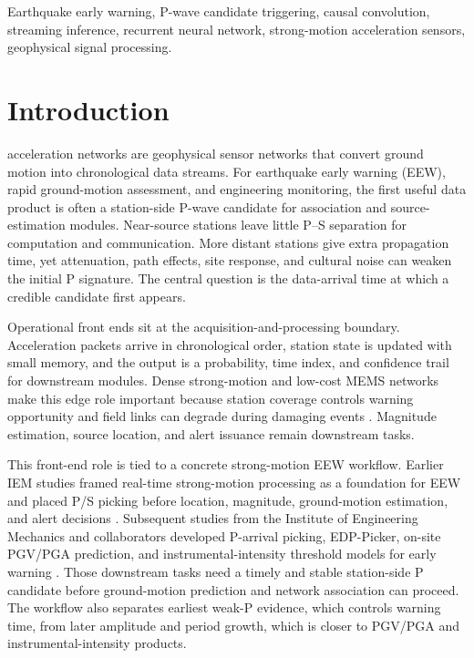 \documentclass[journal]{IEEEtran}
\begin{document}
\begin{IEEEkeywords}
Earthquake early warning, P-wave candidate triggering, causal convolution, streaming inference, recurrent neural network, strong-motion acceleration sensors, geophysical signal processing.
\end{IEEEkeywords}

\section{Introduction}
 acceleration networks are geophysical sensor networks that convert ground motion into chronological data streams. For earthquake early warning (EEW), rapid ground-motion assessment, and engineering monitoring, the first useful data product is often a station-side P-wave candidate for association and source-estimation modules. Near-source stations leave little P--S separation for computation and communication. More distant stations give extra propagation time, yet attenuation, path effects, site response, and cultural noise can weaken the initial P signature. The central question is the data-arrival time at which a credible candidate first appears.

Operational front ends sit at the acquisition-and-processing boundary. Acceleration packets arrive in chronological order, station state is updated with small memory, and the output is a probability, time index, and confidence trail for downstream modules. Dense strong-motion and low-cost MEMS networks make this edge role important because station coverage controls warning opportunity and field links can degrade during damaging events \cite{chandrakumar2022memsreview,hu2021mems,wu2021palertreview}. Magnitude estimation, source location, and alert issuance remain downstream tasks.

This front-end role is tied to a concrete strong-motion EEW workflow. Earlier IEM studies framed real-time strong-motion processing as a foundation for EEW and placed P/S picking before location, magnitude, ground-motion estimation, and alert decisions \cite{ma2002strongmotionrealtime,ma2008eew}. Subsequent studies from the Institute of Engineering Mechanics and collaborators developed P-arrival picking, EDP-Picker, on-site PGV/PGA prediction, and instrumental-intensity threshold models for early warning \cite{ma2013parrival,lu2020edppicker,song2021lssvmpgv,zhu2022hybridpgv,wang2023lstmtpga,li2024lstmintensity,li2024xgboostintensity}. Those downstream tasks need a timely and stable station-side P candidate before ground-motion prediction and network association can proceed. The workflow also separates earliest weak-P evidence, which controls warning time, from later amplitude and period growth, which is closer to PGV/PGA and instrumental-intensity products.
\end{document}
